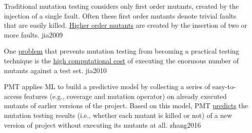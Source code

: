 \documentclass{article}
\begin{document}
  {Traditional mutation testing considers only first order mutants, created by the injection of a single fault. Often these first order mutants denote trivial faults that are easily killed. \ul{Higher order mutants} are created by the insertion of two or more faults.}
  {jia2009}

  {One \ul{problem} that prevents mutation testing from becoming a practical testing technique is the \ul{high computational cost} of executing the enormous number of mutants against a test set.}
  {jia2010}

  {PMT applies ML to build a predictive model by collecting a series of easy-to-access features (e.g., coverage and mutation operator) on already executed mutants of earlier versions of the project. Based on this model, PMT \ul{predicts} the mutation testing results (i.e., whether each mutant is killed or not) of a new version of project without executing its mutants at all.}
  {zhang2016}

\end{document}
